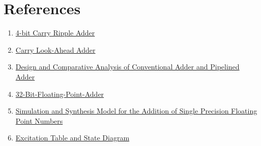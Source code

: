 \documentclass[11pt]{article}
\begin{document}
    \vfill
    
    \section*{References}
    \begin{enumerate}
        \item \href{https://esrd2014.blogspot.com/p/4-bit-carry-ripple-adder.html}{4-bit Carry Ripple Adder}
        \item \href{https://www.geeksforgeeks.org/carry-look-ahead-adder/}{Carry Look-Ahead Adder}
        \item \href{https://www.ijeat.org/wp-content/uploads/papers/v3i2/B2415123213.pdf}{Design and Comparative Analysis of Conventional
        Adder and Pipelined Adder}
        \item \href{https://github.com/ahirsharan/32-Bit-Floating-Point-Adder}{32-Bit-Floating-Point-Adder}
        \item \href{https://www.ijert.org/research/simulation-and-synthesis-model-for-the-addition-of-single-precision-floating-point-numbers-using-verilog-IJERTV2IS90913.pdf}{Simulation and Synthesis Model for the Addition of Single Precision
        Floating Point Numbers}
        \item \href{https://www.electrically4u.com/what-is-the-excitation-table/}{Excitation Table and State Diagram}
    \end{enumerate}
\end{document}
